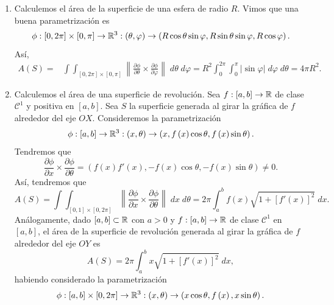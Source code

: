 \begin{eg}
\begin{enumerate}
	\item Calculemos el área de la superficie de una esfera de radio $\displaystyle R $. Vimos que una buena parametrización es 
		\[\phi: \left[0, 2\pi \right] \times \left[0, \pi \right] \to \mathbb{R}^{3} : \left(\theta, \varphi\right)\to \left(R\cos\theta \sin \varphi, R \sin \theta \sin \varphi, R \cos \varphi\right) .\]
		Así, 
	\[
	\begin{split}
		A\left(S\right)= & \int \int _{\left[0, 2\pi \right] \times\left[0, \pi \right] }\left\|\frac{\partial \phi}{\partial \theta} \times \frac{\partial \phi}{\partial \varphi}\right\| \; d\theta  \; d\varphi = R^{2}\int^{2\pi }_{0} \int^{\pi }_{0} \left|\sin \varphi\right| \; d\varphi \; d\theta = 4\pi R^{2} .
	\end{split}
	\]
\item Calculemos el área de una superficie de revolución. Sea $\displaystyle f : \left[a,b\right] \to \mathbb{R} $ de clase $\displaystyle \mathcal{C}^{1} $ y positiva en $\displaystyle \left[a,b\right]  $. Sea $\displaystyle S $ la superficie generada al girar la gráfica de $\displaystyle f $ alrededor del eje $\displaystyle OX $. Consideremos la parametrización
	\[\phi: \left[a,b\right] \to \mathbb{R}^{3} : \left(x, \theta \right)\to \left(x, f\left(x\right)\cos\theta, f\left(x\right)\sin \theta \right) .\]
	Tendremos que 
	\[\frac{\partial \phi}{\partial x}\times\frac{\partial\phi}{\partial \theta }=\left(f\left(x\right)f'\left(x\right), -f\left(x\right)\cos\theta, -f\left(x\right)\sin \theta\right)\neq 0 .\]
	Así, tendremos que 
	\[A\left(S\right)=\int \int _{\left[0,1\right] \times\left[0, 2\pi \right] }\left\|\frac{\partial \phi}{\partial x}\times\frac{\partial\phi}{\partial \theta }\right\| \; dx \; d\theta = 2\pi \int^{b}_{a} f\left(x\right)\sqrt{1 + \left[f'\left(x\right)\right] ^{2}} \; dx .\]
	Análogamente, dado $\displaystyle \left[a,b\right] \subset \mathbb{R} $ con $\displaystyle a > 0 $ y $\displaystyle f : \left[a,b\right] \to \mathbb{R} $ de clase $\displaystyle \mathcal{C}^{1} $ en $\displaystyle \left[a,b\right]  $, el área de la superficie de revolución generada al girar la gráfica de $\displaystyle f $ alrededor del eje $\displaystyle OY $ es
	\[A\left(S\right)=2\pi \int^{b}_{a} x\sqrt{1+\left[f'\left(x\right)\right] ^{2}} \; dx ,\]
	habiendo considerado la parametrización
	\[\phi: \left[a,b\right]\times\left[0,2\pi\right]  \to \mathbb{R}^{3}: \left(x, \theta \right)\to \left(x\cos \theta, f\left(x\right), x\sin \theta \right) .\]
\end{enumerate}
\end{eg}
